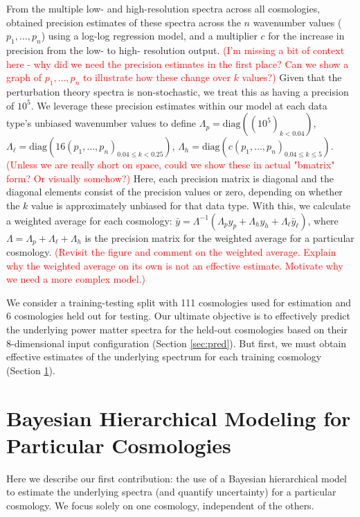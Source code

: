 \documentclass[11pt]{article}
\begin{document}
From the multiple low- and high-resolution spectra across all cosmologies, 
\cite{moran2023mira} obtained precision estimates of these spectra across the $n$ 
wavenumber values ($p_1,\dots,p_n$) using a log-log regression model, and a multiplier 
$c$ for the increase in precision from the low- to high- resolution output. 
\textcolor{red}{(I'm missing a bit of context here - why did we need the precision
estimates in the first place?  Can we show a graph of $p_1,\dots, p_n$ to illustrate
how these change over $k$ values?)}
Given that the perturbation theory spectra is non-stochastic, we treat this as having a 
precision of $10^5$. We leverage these precision estimates within our model at each 
data type's unbiased wavenumber values to define 
$\Lambda_p = \text{diag}\left((10^5)_{k < 0.04}\right)$, 
$\Lambda_{\ell} = \text{diag}\left(16(p_1,\dots,p_n)_{0.04 \leq k < 0.25}\right)$, 
$\Lambda_h = \text{diag}\left(c(p_1,\dots,p_n)_{0.04 \leq k \leq 5}\right)$. 
\textcolor{red}{(Unless we are really short on space, could we show these in
actual "bmatrix" form?  Or visually somehow?)}
Here, each precision matrix is diagonal and the diagonal elements consist of the 
precision values or zero, depending on whether the $k$ value is approximately unbiased 
for that data type. With this, we calculate a weighted average for each cosmology: 
$\bar y = \Lambda^{-1}(\Lambda_p y_p + \Lambda_h y_h + \Lambda_{\ell} \bar{y}_\ell)$, 
where $\Lambda = \Lambda_p + \Lambda_\ell + \Lambda_h$ is the precision matrix for 
the weighted average for a particular cosmology. \textcolor{red}{(Revisit the figure and
comment on the weighted average.  Explain why the weighted
average on its own is not an effective estimate.  Motivate why we need a more complex model.)}

We consider a training-testing split with 111 cosmologies used for estimation and 6 
cosmologies held out for testing.  Our ultimate objective is to effectively predict
the underlying power matter spectra for the held-out cosmologies based on their 
8-dimensional input configuration (Section \ref{sec:pred}).  But first, we must 
obtain effective estimates of the underlying spectrum for each training 
cosmology (Section \ref{sec:hm_fit}). 

\section{Bayesian Hierarchical Modeling for Particular Cosmologies}
\label{sec:hm_fit}

Here we describe our first contribution: the use of a Bayesian hierarchical model 
to estimate the underlying spectra (and quantify uncertainty) for a particular cosmology.  
We focus solely on one cosmology, independent of the others.
\end{document}
